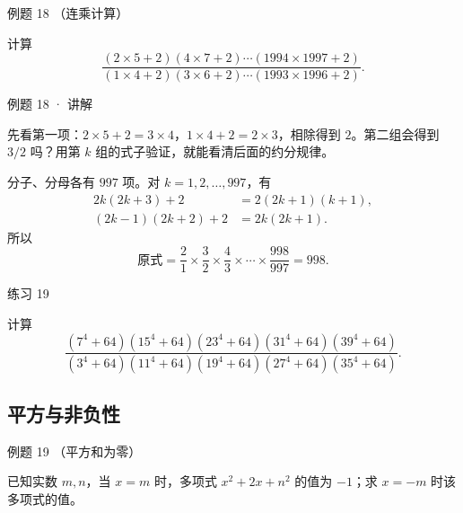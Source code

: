 \begin{problem}{例题 18 （连乘计算）}

计算
\[
\frac{(2\times5+2)(4\times7+2)\cdots(1994\times1997+2)}
{(1\times4+2)(3\times6+2)\cdots(1993\times1996+2)}.
\]

\end{problem}


\begin{solution}{例题 18 · 讲解}

\think 先看第一项：$2\times5+2=3\times4$，$1\times4+2=2\times3$，相除得到 $2$。第二组会得到 $3/2$ 吗？用第 $k$ 组的式子验证，就能看清后面的约分规律。

\solve 分子、分母各有 $997$ 项。对 $k=1,2,\ldots,997$，有
\begin{align*}
2k(2k+3)+2&=2(2k+1)(k+1),\\
(2k-1)(2k+2)+2&=2k(2k+1).
\end{align*}
所以
\[\text{原式}=\frac21\times\frac32\times\frac43\times\cdots\times\frac{998}{997}=998.\]


\end{solution}


\begin{problem}{练习 19}

计算
\[
\frac{(7^4+64)(15^4+64)(23^4+64)(31^4+64)(39^4+64)}
{(3^4+64)(11^4+64)(19^4+64)(27^4+64)(35^4+64)}.
\]

\end{problem}


\subsection{平方与非负性}



\begin{problem}{例题 19 （平方和为零）}

已知实数 $m,n$，当 $x=m$ 时，多项式 $x^2+2x+n^2$ 的值为 $-1$；求 $x=-m$ 时该多项式的值。

\end{problem}

